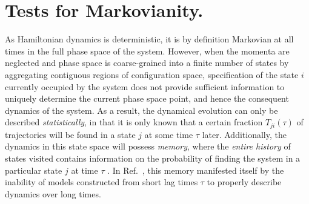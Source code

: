 



\section{Tests for Markovianity.}
\label{validation:section:validation}

As Hamiltonian dynamics is deterministic, it is by definition Markovian at all times in the full phase space of the system.
However, when the momenta are neglected and phase space is coarse-grained into a finite number of states by aggregating contiguous regions of configuration space, specification of the state $i$ currently occupied by the system does not provide sufficient information to uniquely determine the current phase space point, and hence the consequent dynamics of the system.
As a result, the dynamical evolution can only be described \emph{statistically}, in that it is only known that a certain fraction $T_{ji}(\tau)$ of trajectories will be found in a state $j$ at some time $\tau$ later.
Additionally, the dynamics in this state space will possess \emph{memory}, where the \emph{entire history} of states visited contains information on the probability of finding the system in a particular state $j$ at time $\tau$ \cite{park:2006a}.
In Ref.\ \cite{chodera:mms:2006}, this memory manifested itself by the inability of models constructed from short lag times $\tau$ to properly describe dynamics over long times.

